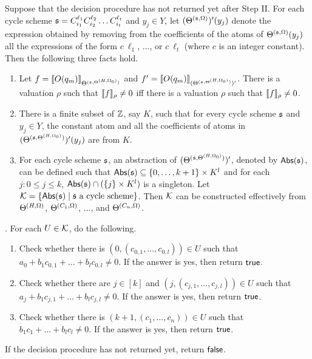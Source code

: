 \smallskip




\begin{proposition}\label{prop-bnd-domain}
Suppose that the decision procedure has not returned yet after Step II. For each cycle scheme ${\mathfrak{s} }=C_{i_1}^{\ell_1} C_{i_2}^{\ell_2} \dots C_{i_t}^{\ell_t}$ and $y_j \in Y$, let $(\Theta^{({\mathfrak{s} },\Omega)})'(y_j)$ denote the expression obtained by removing from the coefficients of the atoms of $\Theta^{({\mathfrak{s} },\Omega)}(y_j)$ all the expressions of the form $c\ \ell_1$, $\dots$, or $c\ \ell_t$ (where $c$ is an integer constant).  Then the following three facts hold.
\begin{enumerate}
\item Let $f=\llbracket O(q_m)\rrbracket_{\Theta^{({\mathfrak{s} }, \Theta^{(H,\Omega_0)})}}$ and $f'=\llbracket O(q_m)\rrbracket_{(\Theta^{({\mathfrak{s} }, \Theta^{(H,\Omega_0)})})'}$.
There is a valuation $\rho$ such that $\llbracket f\rrbracket_{\rho}\neq 0$ iff there is a valuation $\rho$ such that $\llbracket f\rrbracket_{\rho} \neq 0$.
%
\item There is a finite subset of ${\mathbb{Z} }$, say $K$, such that for every cycle scheme ${\mathfrak{s} }$ and $y_j \in Y$, the constant atom and all the coefficients of atoms in $(\Theta^{({\mathfrak{s} }, \Theta^{(H,\Omega_0)})})'(y_j)$ are from $K$. 
%
\item For each cycle scheme ${\mathfrak{s} }$, an abstraction of $(\Theta^{({\mathfrak{s} }, \Theta^{(H,\Omega_0)})})'$, denoted by $\mathsf{Abs}({\mathfrak{s} })$, can be defined such that $\mathsf{Abs}({\mathfrak{s} }) \subseteq \{0,\dots, k+1\} \times K^l$ and for each $j: 0 \le j \le k$,  $\mathsf{Abs}({\mathfrak{s} }) \cap (\{j\} \times K^l)$ is a singleton. Let ${\mathcal{K}}=\{\mathsf{Abs}({\mathfrak{s} }) \mid {\mathfrak{s} } \mbox{ a cycle scheme}\}$. Then ${\mathcal{K}}$ can be constructed effectively from $\Theta^{(H,\Omega)}$, $\Theta^{(C_1,\Omega)}$, $\dots$, and $\Theta^{(C_n,\Omega)}$.
\end{enumerate}
\end{proposition}


. For each $U \in {\mathcal{K}}$, do the following.
\begin{enumerate}
\item Check whether there is $(0,(c_{0,1},\dots,c_{0,l})) \in U$ such that $a_0+b_1 c_{0,1}+\dots + b_l c_{0,l} \neq 0$. If the answer is yes, then return $\mathsf{true}$.
%
\item Check whether there are $j \in [k]$ and $(j, (c_{j,1},\dots,c_{j,l})) \in U$ such that $a_j + b_1 c_{j,1} + \dots + b_l c_{j,l} \neq 0$. If the answer is yes, then return $\mathsf{true}$. 
%
\item Check whether there is $(k+1,(c_1,\dots,c_n)) \in U$ such that $b_1 c_1 + \dots + b_l c_l \neq 0$. If the answer is yes, then return $\mathsf{true}$. 
\end{enumerate}
If the decision procedure has not returned yet, return $\mathsf{false}$.


